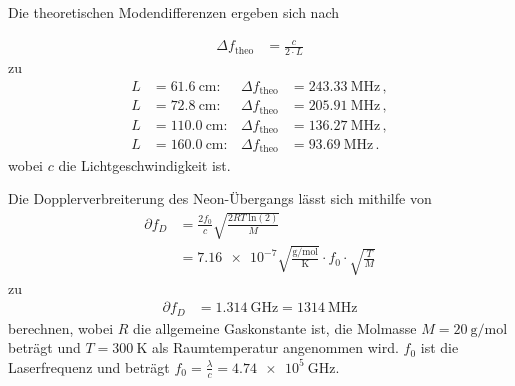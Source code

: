 Die theoretischen Modendifferenzen ergeben sich nach

\begin{align*}
  \Delta f_{\text{theo}} &= \frac{c}{2 \cdot L}
\end{align*}
zu 
\begin{align*}
  L &= \SI{ 61.6}{\centi\meter}: & \Delta f_\text{theo} &= \SI{243.33}{\mega\hertz}\, , \\  
  L &= \SI{ 72.8}{\centi\meter}: & \Delta f_\text{theo} &= \SI{205.91}{\mega\hertz}\, , \\  
  L &= \SI{110.0}{\centi\meter}: & \Delta f_\text{theo} &= \SI{136.27}{\mega\hertz}\, , \\
  L &= \SI{160.0}{\centi\meter}: & \Delta f_\text{theo} &= \SI{93.69}{\mega\hertz}\, . 
\end{align*}
wobei $c$ die Lichtgeschwindigkeit ist.

Die Dopplerverbreiterung des Neon-Übergangs lässt sich mithilfe von 
\begin{align*}
  \partial f_D &= \frac{2f_0}{c} \sqrt{\frac{2RT\: \text{ln}(2)}{M}} \\
  &= \num{7.16e-7}\sqrt{\frac{\si{\gram\per\mol}}{\si{\kelvin}}} \cdot f_0 \cdot \sqrt{\frac{T}{M}}
\end{align*}
zu 
\begin{align*}
  \partial f_D &= \SI{1.314}{\giga\hertz} = \SI{1314}{\mega\hertz}
\end{align*}
berechnen, wobei $R$ die allgemeine Gaskonstante ist, die Molmasse
$M = \SI{20}{\gram\per\mol}$ beträgt und $T=\qty{300}{\kelvin}$ als Raumtemperatur angenommen wird.
$f_0$ ist die Laserfrequenz und beträgt $f_0= \frac{\lambda}{c} = \SI{4.74e5}{\giga\hertz}$.


